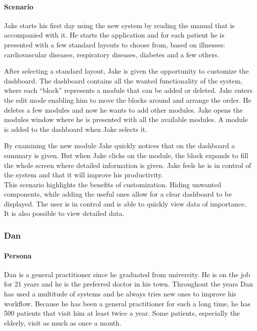         \paragraph{Scenario} Jake starts his first day using the new system by reading the manual that is accompanied with it. He starts the application and for each patient he is presented with a few standard layouts to choose from, based on illnesses: cardiovascular diseases, respiratory diseases, diabetes and a few others.

        After selecting a standard layout, Jake is given the opportunity to customize the dashboard. The dashboard contains all the wanted functionality of the system, where each ``block'' represents a module that can be added or deleted. Jake enters the edit mode enabling him to move the blocks around and arrange the order. He deletes a few modules and now he wants to add other modules. Jake opens the modules window where he is presented with all the available modules. A module is added to the dashboard when Jake selects it.

        By examining the new module Jake quickly notices that on the dashboard a summary is given. But when Jake clicks on the module, the block expands to fill the whole screen where detailed information is given. Jake feels he is in control of the system and that it will improve his productivity.\\

        \noindent This scenario highlights the benefits of customization. Hiding unwanted components, while adding the useful ones allow for a clear dashboard to be displayed. The user is in control and is able to quickly view data of importance. It is also possible to view detailed data.
        
        \subsubsection{Dan}

        \paragraph{Persona} Dan is a general practitioner since he graduated from university. He is on the job for 21 years and he is the preferred doctor in his town. Throughout the years Dan has used a multitude of systems and he always tries new ones to improve his workflow. Because he has been a general practitioner for such a long time, he has 500 patients that visit him at least twice a year. Some patients, especially the elderly, visit as much as once a month.

